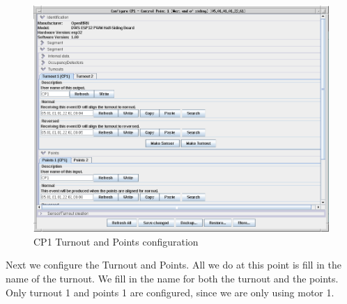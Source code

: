 \clearpage
\begin{figure}[hbpt]\begin{centering}%
\includegraphics[width=5in]{CP1-Turnout-Config.png}
\caption{CP1 Turnout and Points configuration}
\label{fig:CP1-Turnout-Config}
\end{centering}\end{figure}
Next we configure the Turnout and Points.  All we do at this point is fill in 
the name of the turnout.  We fill in the name for both the turnout and the 
points.  Only turnout 1 and points 1 are configured, since we are only using 
motor 1.

